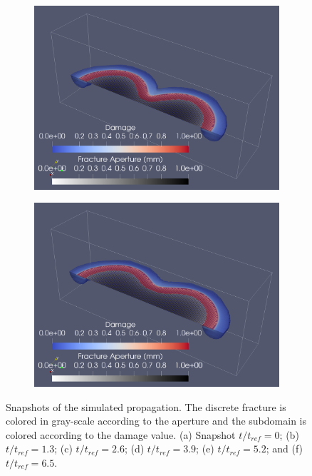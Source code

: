 \begin{figure}[h]
\begin{subfigure}{.45\textwidth}
  \centering
  \includegraphics[width=\linewidth]{Chapter4/figures/merging/merging_t_42.png}
  \caption{}
  \label{fig:merge_t_4}
\end{subfigure}
\hspace{0.85cm}
\begin{subfigure}{.45\textwidth}
  \centering
  \includegraphics[width=\linewidth]{Chapter4/figures/merging/merging_t_67.png}
  \caption{}
  \label{fig:merge_t_5}
\end{subfigure}
  \caption{Snapshots of the simulated propagation. The discrete fracture is colored in gray-scale according to the aperture and the subdomain is colored according to the damage value. (a) Snapshot $t/t_{ref} = 0$; (b) $t/t_{ref} = 1.3$; (c) $t/t_{ref} = 2.6$; (d) $t/t_{ref} = 3.9$; (e) $t/t_{ref} = 5.2$; and (f) $t/t_{ref} = 6.5$. } 
  \label{fig:merge_snapshots}  
\end{figure}

\FloatBarrier


